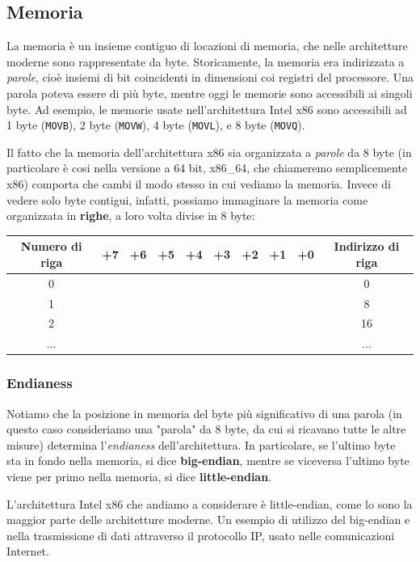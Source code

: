 \documentclass[a4paper,11pt]{article}
\begin{document}
\subsection{Memoria}
La memoria è un insieme contiguo di locazioni di memoria, che nelle architetture moderne sono rappresentate da byte.
Storicamente, la memoria era indirizzata a \textit{parole}, cioè insiemi di bit coincidenti in dimensioni coi registri del processore.
Una parola poteva essere di più byte, mentre oggi le memorie sono accessibili ai singoli byte.
Ad esempio, le memorie usate nell'architettura Intel x86 sono accessibili ad 1 byte (\lstinline|MOVB|), 2 byte (\lstinline|MOVW|), 4 byte (\lstinline|MOVL|), e 8 byte (\lstinline|MOVQ|).

Il fatto che la memoria dell'architettura x86 sia organizzata a \textit{parole} da 8 byte (in particolare è cosi nella versione a 64 bit, x86\_64, che chiameremo semplicemente x86) comporta che cambi il modo stesso in cui vediamo la memoria.
Invece di vedere solo byte contigui, infatti, possiamo immaginare la memoria come organizzata in \textbf{righe}, a loro volta divise in 8 byte:

\begin{table}[h!]
	\center 
	\begin{tabular} { c || c | c | c | c | c | c | c | c || c }
		\bfseries Numero di riga & +7 & +6 & +5 & +4 & +3 & +2 & +1 & +0 & \bfseries Indirizzo di riga \\
		\hline
		0 & & & & & & & & & 0 \\
		\hline
		1 & & & & & & & & & 8 \\ 
		\hline
		2 & & & & & & & & & 16 \\ 
		\hline
		... & & & & & & & & & ...
	\end{tabular}
\end{table}

\subsubsection{Endianess}
Notiamo che la posizione in memoria del byte più significativo di una parola (in questo caso consideriamo una "parola" da 8 byte, da cui si ricavano tutte le altre misure) determina l'\textit{endianess} dell'architettura.
In particolare, se l'ultimo byte sta in fondo nella memoria, si dice \textbf{big-endian}, mentre se viceversa l'ultimo byte viene per primo nella memoria, si dice \textbf{little-endian}.

L'architettura Intel x86 che andiamo a considerare è little-endian, come lo sono la maggior parte delle architetture moderne.
Un esempio di utilizzo del big-endian e nella trasmissione di dati attraverso il protocollo IP, usato nelle comunicazioni Internet.
\end{document}
